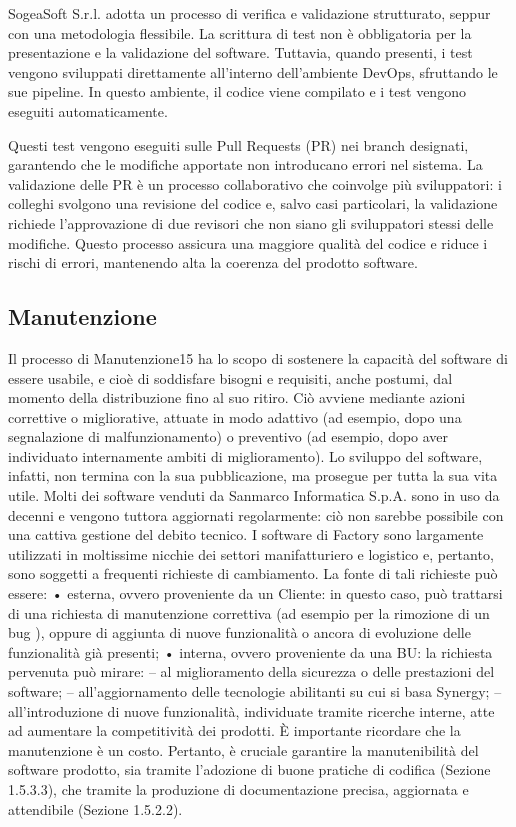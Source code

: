 SogeaSoft S.r.l. adotta un processo di verifica e validazione strutturato, seppur con una metodologia flessibile. La scrittura di test non è obbligatoria per la presentazione e la validazione del software. Tuttavia, quando presenti, i test vengono sviluppati direttamente all’interno dell'ambiente DevOps, sfruttando le sue pipeline. In questo ambiente, il codice viene compilato e i test vengono eseguiti automaticamente.

Questi test vengono eseguiti sulle Pull Requests (PR) nei branch designati, garantendo che le modifiche apportate non introducano errori nel sistema. La validazione delle PR è un processo collaborativo che coinvolge più sviluppatori: i colleghi svolgono una revisione del codice e, salvo casi particolari, la validazione richiede l’approvazione di due revisori che non siano gli sviluppatori stessi delle modifiche. Questo processo assicura una maggiore qualità del codice e riduce i rischi di errori, mantenendo alta la coerenza del prodotto software.
        
        \subsection{Manutenzione}
Il processo di Manutenzione15 ha lo scopo di sostenere la capacità del software di essere usabile, e cioè di soddisfare bisogni e requisiti, anche postumi, dal momento della distribuzione fino al suo ritiro.
Ciò avviene mediante azioni correttive o migliorative, attuate in modo adattivo (ad esempio, dopo una segnalazione di malfunzionamento) o preventivo (ad esempio, dopo aver individuato internamente ambiti di miglioramento). Lo sviluppo del software, infatti, non termina con la sua pubblicazione, ma prosegue per tutta la sua vita utile. Molti dei software venduti da Sanmarco Informatica S.p.A. sono in uso da decenni e vengono tuttora aggiornati regolarmente: ciò non sarebbe possibile con una cattiva gestione del debito tecnico.
I software di Factory sono largamente utilizzati in moltissime nicchie dei settori manifatturiero e logistico e, pertanto, sono soggetti a frequenti richieste di cambiamento. La fonte di tali richieste può essere:
• esterna, ovvero proveniente da un Cliente: in questo caso, può trattarsi di una richiesta di
manutenzione correttiva (ad esempio per la rimozione di un bug ), oppure di aggiunta di nuove
funzionalità o ancora di evoluzione delle funzionalità già presenti;
• interna, ovvero proveniente da una BU: la richiesta pervenuta può mirare:
– al miglioramento della sicurezza o delle prestazioni del software;
– all’aggiornamento delle tecnologie abilitanti su cui si basa Synergy;
– all’introduzione di nuove funzionalità, individuate tramite ricerche interne, atte ad aumentare
la competitività dei prodotti.
È importante ricordare che la manutenzione è un costo. Pertanto, è cruciale garantire la manutenibilità del software prodotto, sia tramite l’adozione di buone pratiche di codifica (Sezione 1.5.3.3), che tramite la produzione di documentazione precisa, aggiornata e attendibile (Sezione 1.5.2.2).

